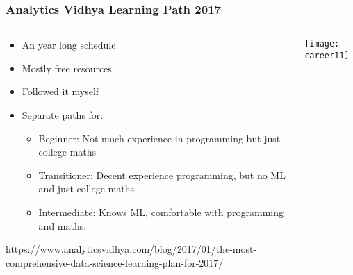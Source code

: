 \begin{frame}[fragile]\frametitle{Analytics Vidhya Learning Path 2017}
\begin{columns}
    \begin{column}[T]{0.5\linewidth}
      \begin{itemize}
			\item An year long schedule
			\item Mostly free resources
			\item Followed it myself
			\item Separate paths for:
			      \begin{itemize}

						\item Beginner: Not much experience in programming but just college maths
						\item Transitioner: Decent experience programming, but no ML and just college maths
						\item Intermediate: Knows ML, comfortable with programming and maths.
						\end{itemize}
			\end{itemize}
				https://www.analyticsvidhya.com/blog/2017/01/the-most-comprehensive-data-science-learning-plan-for-2017/

		\end{column}
    \begin{column}[T]{0.5\linewidth}
		
	\begin{center}
	\texttt{[image: career11]}
	\end{center}
    \end{column}
  \end{columns}
	

	
\end{frame}

